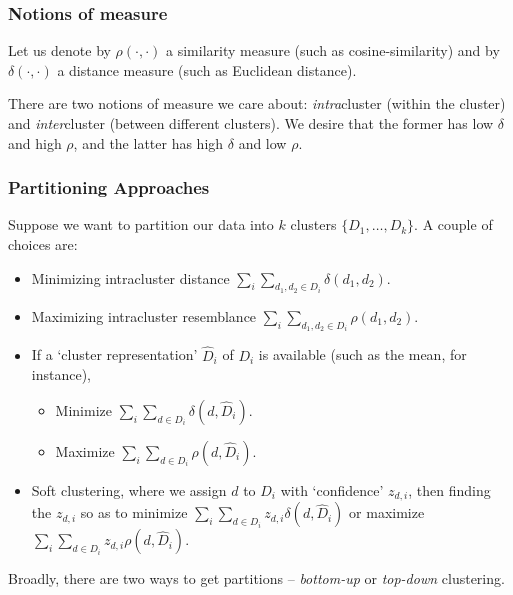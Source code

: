 \documentclass{article}
\begin{document}
		\subsubsection{Notions of measure}

			Let us denote by $\rho(\cdot,\cdot)$ a similarity measure (such as cosine-similarity) and by $\delta(\cdot,\cdot)$ a distance measure (such as Euclidean distance).

			There are two notions of measure we care about: \emph{intra}cluster (within the cluster) and \emph{inter}cluster (between different clusters). We desire that the former has low $\delta$ and high $\rho$, and the latter has high $\delta$ and low $\rho$.\\


		\subsubsection{Partitioning Approaches}

			Suppose we want to partition our data into $k$ clusters $\{D_1,\ldots,D_k\}$. A couple of choices are:
			\begin{itemize}
				\item Minimizing intracluster distance $\sum_i \sum_{d_1,d_2 \in D_i} \delta(d_1,d_2)$.
				\item Maximizing intracluster resemblance $\sum_i \sum_{d_1,d_2 \in D_i} \rho(d_1,d_2)$.
				\item If a `cluster representation' $\hat{D}_i$ of $D_i$ is available (such as the mean, for instance),
				\begin{itemize}
					\item Minimize $\sum_i \sum_{d \in D_i} \delta(d,\hat{D}_i)$.
					\item Maximize $\sum_i \sum_{d\in D_i} \rho(d,\hat{D}_i)$.
				\end{itemize}
				\item Soft clustering, where we assign $d$ to $D_i$ with `confidence' $z_{d,i}$, then finding the $z_{d,i}$ so as to minimize $\sum_{i} \sum_{d\in D_i} z_{d,i} \delta(d,\hat{D}_i)$ or maximize $\sum_i \sum_{d\in D_i} z_{d,i} \rho(d,\hat{D}_i)$.
			\end{itemize}

			Broadly, there are two ways to get partitions -- \emph{bottom-up} or \emph{top-down} clustering.\\
\end{document}
